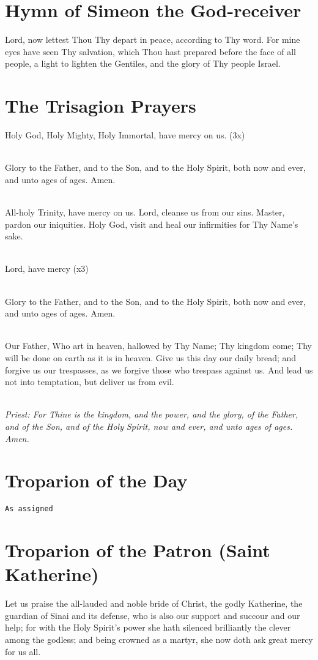 \section*{Hymn of Simeon the God-receiver}
Lord, now lettest Thou Thy depart in peace, 
according to Thy word.
For mine eyes have seen Thy salvation,
which Thou hast prepared before the face of all people,
a light to lighten the Gentiles,
and the glory of Thy people Israel.

\section*{The Trisagion Prayers}
Holy God, Holy Mighty, Holy Immortal, have mercy on us. (3x)

\mbox{}\\
Glory to the Father, and to the Son, and to the Holy Spirit, both now and ever, and unto ages of ages. Amen.

\mbox{}\\
All-holy Trinity, have mercy on us.
Lord, cleanse us from our sins.
Master, pardon our iniquities.
Holy God, visit and heal our infirmities for Thy Name's sake.

\mbox{}\\
Lord, have mercy (x3)

\mbox{}\\
Glory to the Father, and to the Son, and to the Holy Spirit, both now and ever, and unto ages of ages. Amen.

\mbox{}\\
Our Father, Who art in heaven, hallowed by Thy Name;
Thy kingdom come; Thy will be done on earth as it is in heaven.
Give us this day our daily bread;
and forgive us our trespasses, as we forgive those who 
trespass against us.  And lead us not into temptation,
but deliver us from evil.

\mbox{}\\
\emph{Priest: For Thine is the kingdom, and the power, and the glory,
of the Father, and of the Son, and of the Holy Spirit, now and ever,
and unto ages of ages. Amen.}

\section*{Troparion of the Day}
\texttt{As assigned}

\section*{Troparion of the Patron (Saint Katherine)}
Let us praise the all-lauded and noble bride of Christ,
the godly Katherine,
the guardian of Sinai and its defense,
who is also our support and succour and our help;
for with the Holy Spirit's power
she hath silenced brilliantly the clever among the godless;
and being crowned as a martyr, she now doth ask great mercy for us all.

